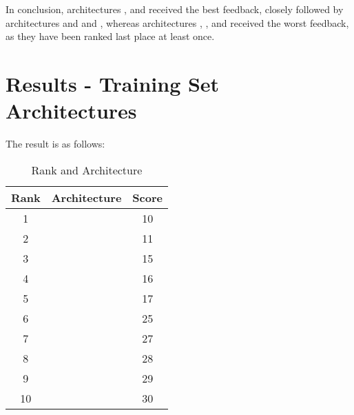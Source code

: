 In conclusion, architectures , and  received the best feedback, 
closely followed by architectures  and  and ,
whereas architectures , , 
and  received the worst feedback, as they have been ranked last place at least once.

\section{Results - Training Set Architectures}

The result is as follows:

\begin{table}[h]
    \label{table:survey}
    \centering
    \caption{Rank and Architecture}
    \begin{tabular}{ |c|c|c| } 
    \hline
    Rank & Architecture & Score \\
    \hline
    1 & \nameref{fig:architecture3} & 10 \\
    2 & \nameref{fig:architecture8} & 11 \\
    3 & \nameref{fig:architecture6} & 15 \\
    4 & \nameref{fig:architecture10} & 16 \\
    5 & \nameref{fig:architecture2} & 17 \\
    6 & \nameref{fig:architecture1} & 25 \\
    7 & \nameref{fig:architecture5} & 27 \\
    8 & \nameref{fig:architecture7} & 28 \\
    9 & \nameref{fig:architecture9} & 29 \\
    10 & \nameref{fig:architecture4} & 30\\
    \hline
    \end{tabular}
\end{table}
